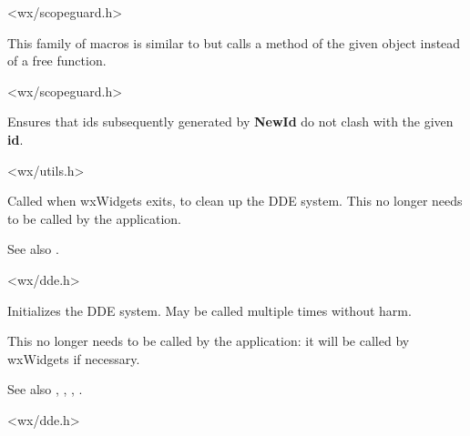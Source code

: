 <wx/scopeguard.h>




\label{wxonblockexitobj}


This family of macros is similar to 
but calls a method of the given object instead of a free function.


<wx/scopeguard.h>


\label{wxregisterid}


Ensures that ids subsequently generated by {\bf NewId} do not clash with
the given {\bf id}.


<wx/utils.h>


\label{wxddecleanup}


Called when wxWidgets exits, to clean up the DDE system. This no longer needs to be
called by the application.

See also .


<wx/dde.h>


\label{wxddeinitialize}


Initializes the DDE system. May be called multiple times without harm.

This no longer needs to be called by the application: it will be called
by wxWidgets if necessary.

See also , , ,\rtfsp
{}.


<wx/dde.h>


